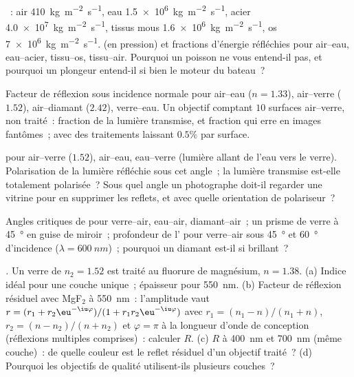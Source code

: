 \begin{exercise}[$\star$]\label{exo:b2:wave-interfaces:1}
~: air \qty{410}{kg.m^{-2}.s^{-1}}, eau \qty{1.5e6}{kg.m^{-2}.s^{-1}},
acier \qty{4.0e7}{kg.m^{-2}.s^{-1}}, tissus mous \qty{1.6e6}{kg.m^{-2}.s^{-1}}, os
\qty{7e6}{kg.m^{-2}.s^{-1}}.  (en pression) et fractions
d'énergie réfléchies pour air--eau, eau--acier, tissu--os,
tissu--air. Pourquoi un poisson ne vous entend-il pas, et pourquoi un plongeur entend-il
si bien le moteur du bateau~?
\end{exercise}

\begin{exercise}[$\star$]\label{exo:b2:wave-interfaces:2}
Facteur de réflexion sous incidence normale pour air--eau ($n = 1.33$), air--verre
($1.52$), air--diamant ($2.42$), verre--eau. Un objectif comptant $10$
surfaces air--verre, non traité~: fraction de la lumière transmise, et
fraction qui erre en images fantômes~; avec des traitements laissant
$0.5\%$ par surface.
\end{exercise}

\begin{exercise}[$\star$]\label{exo:b2:wave-interfaces:3}
 pour air--verre ($1.52$), air--eau, eau--verre
(lumière allant de l'eau vers le verre). Polarisation de la lumière
réfléchie sous cet angle~; la lumière transmise est-elle totalement polarisée~? Sous quel
angle un photographe doit-il regarder une vitrine pour en supprimer les
reflets, et avec quelle orientation de polariseur~?
\end{exercise}

\begin{exercise}[$\star$]\label{exo:b2:wave-interfaces:4}
Angles critiques de  pour verre--air, eau--air,
diamant--air~; un prisme de verre à \qty{45}{\degree} en guise de miroir~; profondeur de
l' pour verre--air sous \qty{45}{\degree} et \qty{60}{\degree}
d'incidence ($\lambda = \qty{600}{nm}$)~; pourquoi un diamant est-il si brillant~?
\end{exercise}

\begin{exercise}[$\star\star$]\label{exo:b2:wave-interfaces:5}
\emph{.} Un verre de $n_2 = 1.52$ est traité au
fluorure de magnésium, $n = 1.38$. (a) Indice idéal pour une couche unique~;
épaisseur pour \qty{550}{nm}. (b) Facteur de réflexion résiduel avec MgF$_2$ à
\qty{550}{nm}~: l'amplitude vaut $r = (r_1 + r_2\eu^{-\iu\varphi})/(1 + r_1r_2
\eu^{-\iu\varphi})$ avec $r_1 = (n_1 - n)/(n_1 + n)$, $r_2 = (n - n_2)/(n + n_2)$
et $\varphi = \pi$ à la longueur d'onde de conception (réflexions multiples
comprises)~: calculer $R$. (c) $R$ à \qty{400}{nm} et \qty{700}{nm} (même
couche)~: de quelle couleur est le reflet résiduel d'un objectif traité~?
(d) Pourquoi les objectifs de qualité utilisent-ils plusieurs couches~?
\end{exercise}

